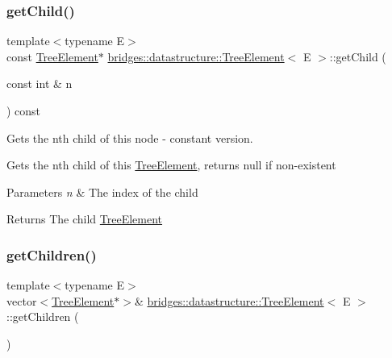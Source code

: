 \subsubsection{\texorpdfstring{get\+Child()}{getChild()}\hspace{0.1cm}{\footnotesize\ttfamily [2/2]}}
{\footnotesize\ttfamily template$<$typename E$>$ \\
const \hyperlink{classbridges_1_1datastructure_1_1_tree_element}{Tree\+Element}$\ast$ \hyperlink{classbridges_1_1datastructure_1_1_tree_element}{bridges\+::datastructure\+::\+Tree\+Element}$<$ E $>$\+::get\+Child (\begin{DoxyParamCaption}\item[{const int \&}]{n }\end{DoxyParamCaption}) const\hspace{0.3cm}{\ttfamily [inline]}}



Gets the nth child of this node -\/ constant version. 

Gets the nth child of this \hyperlink{classbridges_1_1datastructure_1_1_tree_element}{Tree\+Element}, returns null if non-\/existent


\begin{DoxyParams}{Parameters}
{\em n} & The index of the child \\
\hline
\end{DoxyParams}
\begin{DoxyReturn}{Returns}
The child \hyperlink{classbridges_1_1datastructure_1_1_tree_element}{Tree\+Element} 
\end{DoxyReturn}
\mbox{\label{classbridges_1_1datastructure_1_1_tree_element_a3ea19ec0178ceb531a707d87d6fd42d3}} 
\subsubsection{\texorpdfstring{get\+Children()}{getChildren()}\hspace{0.1cm}{\footnotesize\ttfamily [1/2]}}
{\footnotesize\ttfamily template$<$typename E$>$ \\
vector$<$\hyperlink{classbridges_1_1datastructure_1_1_tree_element}{Tree\+Element}$\ast$$>$\& \hyperlink{classbridges_1_1datastructure_1_1_tree_element}{bridges\+::datastructure\+::\+Tree\+Element}$<$ E $>$\+::get\+Children (\begin{DoxyParamCaption}{ }\end{DoxyParamCaption})\hspace{0.3cm}{\ttfamily [inline]}}



